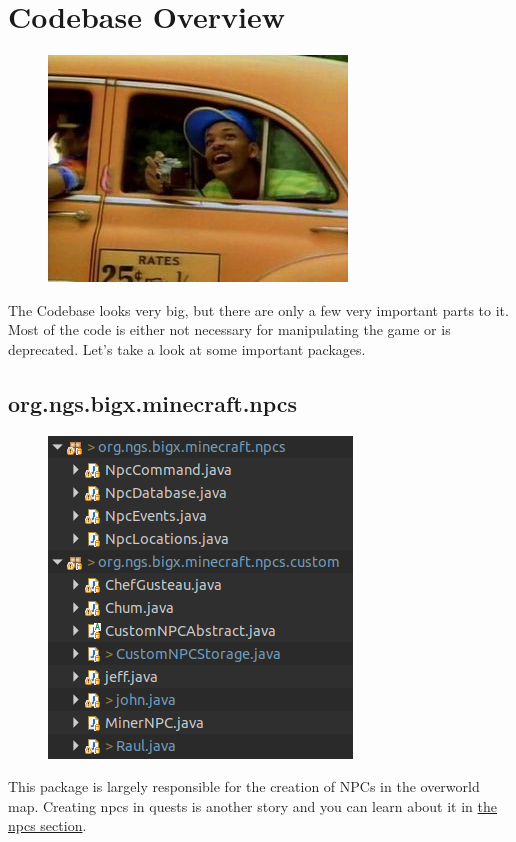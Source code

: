 \documentclass[12pt]{article}
\begin{document}
\section {Codebase Overview}
\label{sec:overview}
\begin{figure}[h]
	\includegraphics[scale=0.5]{images/will_smith_with_camera}
	\centering
\end{figure}
The Codebase looks very big, but there are only a few very important parts to it. Most of the code is either not necessary for manipulating the game or is deprecated. Let's take a look at some important packages. 

\subsection{org.ngs.bigx.minecraft.npcs}
\begin{figure}[h]
	\includegraphics[scale=0.5]{images/tour/orgNgsBigxMinecraftNpcs.png}
	\centering
\end{figure}

This package is largely responsible for the creation of NPCs in the overworld map. Creating npcs in quests is another story and you can learn about it in \hyperref[sec:npcs]{the npcs section}. 
\end{document}
